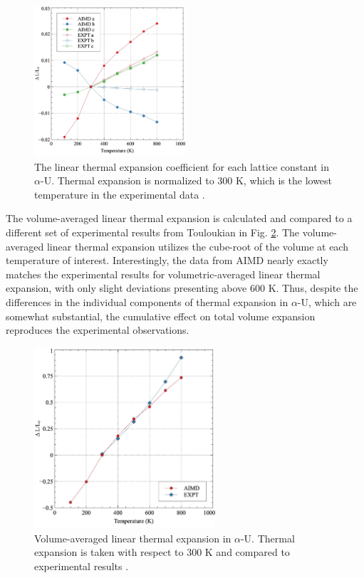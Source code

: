 \documentclass[utf8]{frontiersSCNS} %
\begin{document}
 \begin{figure}[hbt]
	\centering
	\includegraphics[width=0.5\textwidth]{lte.jpg}
  \caption{The linear thermal expansion coefficient for each lattice constant in $\alpha$-U. Thermal expansion is normalized to 300 K, which is the lowest temperature in the experimental data \cite{touloukian}. }\label{fig:exp}
\end{figure}

\FloatBarrier

The volume-averaged linear thermal expansion is calculated and compared to a different set of experimental results from Touloukian \cite{touloukian} in Fig. \ref{fig:vol}. The volume-averaged linear thermal expansion utilizes the cube-root of the volume at each temperature of interest. Interestingly, the data from AIMD nearly exactly matches the experimental results for volumetric-averaged linear thermal expansion, with only slight deviations presenting above 600 K. Thus, despite the differences in the individual components of thermal expansion in $\alpha$-U, which are somewhat substantial, the cumulative effect on total volume expansion reproduces the experimental observations. 

 \begin{figure}[hbt]
	\centering
	\includegraphics[width=0.6\textwidth]{vte.jpg}
  \caption{Volume-averaged linear thermal expansion in $\alpha$-U. Thermal expansion is taken with respect to 300 K and compared to experimental results \cite{touloukian}.}\label{fig:vol}
\end{figure}
\end{document}
